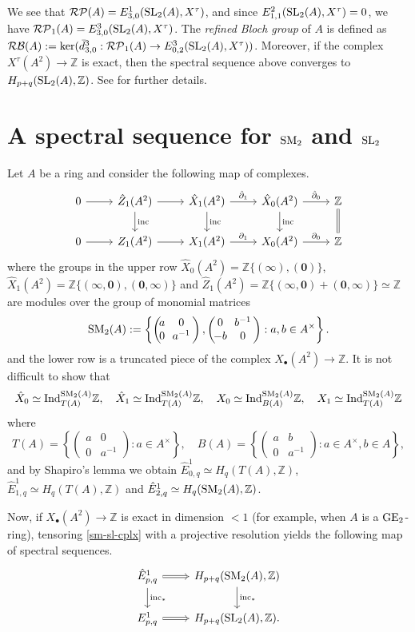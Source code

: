 \documentclass[11pt]{amsart}
\theoremstyle{definition}
\theoremstyle{plain}
\theoremstyle{definition}
\numberwithin{equation}{section}
\newcommand{\z}{\mathbb{Z}}
\newcommand{\RP}{\mathcal{RP}}
\newcommand{\RB}{\mathcal{RB}}
\renewcommand{\aa}{{A^\times}}
\newcommand{\GE}{{\rm GE}}
\newcommand{\Ind}{{\rm Ind}}
\newcommand{\SL}{\mathit{{\rm SL}}}
\newcommand{\SM}{\mathit{{\rm SM}}}
\newcommand{\inc}{{\rm inc}}
\newcommand{\mtxx}[4]
{\left(\!\!
	\begin{array}{cc}
		\!\!#1 & \!\!#2\\
		\!\!#3 & \!\!#4
	\end{array}\!\!
	\right)}
\begin{document}
	We see that $\RP(A)=E^1_{3,0}(\SL_2(A),X^{\tau})$, and since $E^2_{1,1}(\SL_2(A),X^\tau)=0$, we have $\RP_1(A)=E^3_{3,0}(\SL_2(A),X^{\tau})$. The \textit{refined Bloch group} of $A$ is defined as $\RB(A):=\ker(\bar{d}^3_{3,0}:\RP_1(A)\to E^3_{0,2}(\SL_2(A),X^{\tau}))$. Moreover, if the complex $X^{\tau}(A^2)\to\z$ is exact, then the spectral sequence above converges to $H_{p+q}(\SL_2(A),\z)$. See \cite[\S 3]{C-H2022} for further details.
	\section{A spectral sequence for \texorpdfstring{$\SM_2$}{SM2} and \texorpdfstring{$\SL_2$}{SL2}}
	Let $A$ be a ring and consider the following map of complexes.
	\begin{equation}
		\label{sm-sl-cplx}
		\begin{tikzcd}
			0\ar[r] & \hat{Z}_1(A^2)\ar[r]\ar[d,"\inc"] & \hat{X}_1(A^2)\ar[r,"\hat{\partial}_1"]\ar[d,"\inc"] & \hat{X}_0(A^2)\ar[r,"\hat{\partial}_0"]\ar[d,"\inc"] & \z\ar[d,equal]\\
			0\ar[r] & Z_1(A^2)\ar[r] & X_1(A^2)\ar[r,"\partial_1"] & X_0(A^2)\ar[r,"\partial_0"] & \z
		\end{tikzcd}
	\end{equation}
	where the groups in the upper row $\hat{X}_0(A^2)=\z\{(\pmb{\infty}),(\pmb{0})\}$, $\hat{X}_1(A^2)=\z\{(\pmb{\infty},\pmb{0}),(\pmb{0},\pmb{\infty})\}$ and $\hat{Z}_1(A^2)=\z\{(\pmb{\infty},\pmb{0})+(\pmb{0},\pmb{\infty})\}\simeq\z$ are modules over the group of monomial matrices
	\[
	\SM_2(A):=\left\{\mtxx{a}{0}{0}{a^{-1}},\mtxx{0}{b^{-1}}{-b}{0}: a,b\in\aa\right\}.
	\]
	and the lower row is a truncated piece of the complex $X_{\bullet}(A^2)\to\z$. It is not difficult to show that
	\begin{equation}
		\label{struct-X-hatX}
		\hat{X}_0\simeq\Ind^{\SM_2(A)}_{T(A)}\z,\quad \hat{X}_1\simeq\Ind^{\SM_2(A)}_{T(A)}\z,\quad  X_0\simeq\Ind^{\SM_2(A)}_{B(A)}\z,\quad X_1\simeq\Ind^{\SM_2(A)}_{T(A)}\z    
	\end{equation}
	where
	\[
	T(A)=\left\{\mtxx{a}{0}{0}{a^{-1}}: a\in\aa\right\},\quad B(A)=\left\{\mtxx{a}{b}{0}{a^{-1}}: a\in\aa, b\in A\right\},
	\]
	and by Shapiro's lemma we obtain $\hat{E}^1_{0,q}\simeq H_q(T(A),\z)$, $\hat{E}^1_{1,q}\simeq H_q(T(A),\z)$ and $\hat{E}^1_{2,q}\simeq H_q(\SM_2(A),\z)$.
	
	Now, if $X_{\bullet}(A^2)\to\z$ is exact in dimension $<1$ (for example, when $A$ is a $\GE_2$-ring), tensoring \eqref{sm-sl-cplx} with a projective resolution yields the following map of spectral sequences.
	\begin{equation}\label{map-s-seq}
		\begin{tikzcd}
			\hat{E}^1_{p,q}\ar[r,Rightarrow]\ar[d,"\inc_*"] & H_{p+q}(\SM_2(A),\z)\ar[d,"\inc_*"]\\
			E^1_{p,q}\ar[r,Rightarrow] & H_{p+q}(\SL_2(A),\z).
		\end{tikzcd}
	\end{equation}
	
\end{document}
